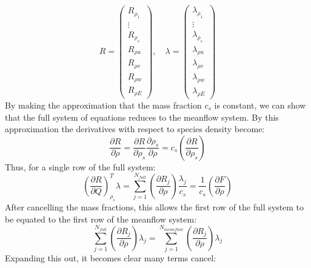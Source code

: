 \documentclass[10pt]{article}
\begin{document}
\begin{equation}
  R = \begin{pmatrix} 
        R_{\rho_1} \\ \vdots \\ R_{\rho_s} \\ R_{\rho u} \\
        R_{\rho v} \\ R_{\rho w} \\ R_{\rho E}
      \end{pmatrix}, \quad
      \lambda = \begin{pmatrix}
        \lambda_{\rho_1} \\ \vdots \\ \lambda_{\rho_s} \\
        \lambda_{\rho u} \\ \lambda_{\rho v} \\ \lambda_{\rho w} \\
        \lambda_{\rho E}
      \end{pmatrix}
  \label{full_sys}
\end{equation}
By making the approximation that the mass fraction $c_s$ is constant, we can show that the full system of equations reduces to the meanflow system.  By this approximation the derivatives with respect to species density become:
\begin{equation}
  \frac{\partial R}{\partial \rho} =
  \frac{\partial R}{\partial \rho_s} 
  \frac{\partial \rho_s}{\partial \rho} =
  c_s\left(\frac{\partial R}{\partial \rho_s}\right)
  \label{mass_frac_approx}
\end{equation}
Thus, for a single row of the full system:
\begin{equation}
  \left(\frac{\partial R}{\partial Q}\right)_{\rho_s}^T \lambda 
  = \sum_{j=1}^{N_{full}}{
    \left(\frac{\partial R_j}{\partial \rho}\right) \frac{\lambda_j}{c_s}}
    = \frac{1}{c_s}\left(\frac{\partial F}{\partial \rho}\right)
  \label{full_reduction}
\end{equation}
After cancelling the mass fractions, this allows the first row of the full system to be equated to the first row of the meanflow system:
\begin{equation}
  \sum_{j=1}^{N_{full}}{
    \left(\frac{\partial R_j}{\partial \rho}\right) \lambda_j}
  = \sum_{j=1}^{N_{meanflow}}{
    \left(\frac{\partial R_j}{\partial \rho}\right) \lambda_j}
  \label{eq_mean_full}
\end{equation}
Expanding this out, it becomes clear many terms cancel:
\end{document}
